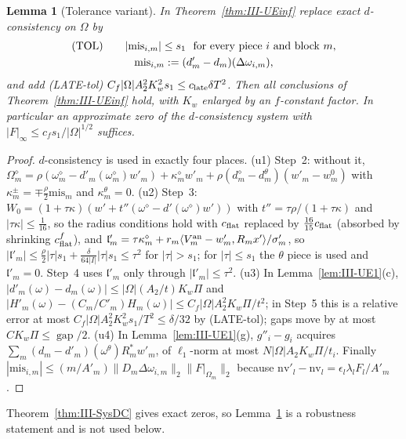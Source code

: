 \documentclass[10pt]{amsart}
\newtheorem{lemma}[theorem]{Lemma}
\theoremstyle{definition}
\theoremstyle{remark}
\newcommand{\gap}{\operatorname{gap}}
\newcommand{\ip}[2]{\langle #1,#2\rangle}
\newcommand{\lin}{\mathfrak l}
\begin{document}
\begin{lemma}[Tolerance variant]\label{lem:III-tol}
In Theorem~\textup{\ref{thm:III-UEinf}} replace exact $d$-consistency on
$\Omega$ by
\begin{gather*}
 \textup{(TOL)}\qquad|\mathrm{mis}_{i,m}|\le s_1\ \text{ for every piece }i
 \text{ and block }m,\\ \mathrm{mis}_{i,m}:=(d'_m-d_m)(\Delta\omega_{i,m}),
\end{gather*}
and add \textup{(LATE-tol)} $C_f|\Omega|A_2^2K_w^2s_1\le c_{\rm late}\delta T^2$.
Then all conclusions of Theorem~\textup{\ref{thm:III-UEinf}} hold, with $K_w$
enlarged by an $f$-constant factor.  In particular an approximate zero of the
$d$-consistency system with $|F|_\infty\le c_fs_1/|\Omega|^{1/2}$ suffices.
\end{lemma}

\begin{proof}
$d$-consistency is used in exactly four places.  (u1) Step~2: without it,
$\Omega^\diamond_m=\rho(\omega^\diamond_m-d'_m(\omega^\diamond_m)w'_m)+
\kappa^\diamond_mw'_m+\rho(d^\diamond_m-d^\theta_m)(w'_m-w^0_m)$ with
$\kappa^\pm_m=\mp\frac\rho2\mathrm{mis}_m$ and $\kappa^\theta_m=0$.  (u2) Step~3:
$W_0=(1+\tau\kappa)(w'+t''(\omega^\diamond-d'(\omega^\diamond)w'))$ with
$t''=\tau\rho/(1+\tau\kappa)$ and $|\tau\kappa|\le\frac1{16}$, so the radius
conditions hold with $c_{\rm flat}$ replaced by $\frac{16}{15}c_{\rm flat}$
(absorbed by shrinking $c^f_{\rm flat}$), and $\lin'_m=\tau\kappa^\diamond_m+
r_m\ip{V^{\rm an}_m-w'_m}{R_mx'}/\sigma'_m$, so $|\lin'_m|\le\frac\rho2|\tau|s_1+
\frac\delta{64|I|}|\tau|s_1\le\tau^2$ for $|\tau|>s_1$; for $|\tau|\le s_1$ the
$\theta$ piece is used and $\lin'_m=0$.  Step~4 uses $\lin'_m$ only through
$|\lin'_m|\le\tau^2$.  (u3) In Lemma~\ref{lem:III-UE1}(c), $|d'_m(\omega)-
d_m(\omega)|\le|\Omega|(A_2/t)K_w\Pi$ and $|H'_m(\omega)-(C_m/C'_m)H_m(\omega)|\le
C_f|\Omega|A_2^2K_w\Pi/t^2$; in Step~5 this is a relative error at most
$C_f|\Omega|A_2^2K_w^2s_1/T^2\le\delta/32$ by (LATE-tol); gaps move by at most
$CK_w\Pi\le\gap/2$.  (u4) In Lemma~\ref{lem:III-UE1}(g), $g''_i-g_i$ acquires
$\sum_m(d_m-d'_m)(\omega^\theta)R_m^*w'_m$, of $\ell_1$-norm at most
$N|\Omega|A_2K_w\Pi/t_i$.  Finally $|\mathrm{mis}_{i,m}|\le(m/A'_m)\|D_m\Delta
\omega_{i,m}\|_2\|F|_{\Omega_m}\|_2$ because $\mathrm{nv}'_l-\mathrm{nv}_l=\epsilon_l
\lambda_lF_l/A'_m$.
\end{proof}

Theorem~\ref{thm:III-SysDC} gives exact zeros, so Lemma~\ref{lem:III-tol} is a
robustness statement and is not used below.
\end{document}
